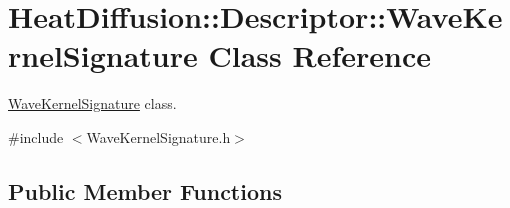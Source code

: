 \hypertarget{classHeatDiffusion_1_1Descriptor_1_1WaveKernelSignature}{\section{Heat\-Diffusion\-:\-:Descriptor\-:\-:Wave\-Kernel\-Signature Class Reference}
\label{classHeatDiffusion_1_1Descriptor_1_1WaveKernelSignature}
}


\hyperlink{classHeatDiffusion_1_1Descriptor_1_1WaveKernelSignature}{Wave\-Kernel\-Signature} class.  




{\ttfamily \#include $<$Wave\-Kernel\-Signature.\-h$>$}

\subsection*{Public Member Functions}
